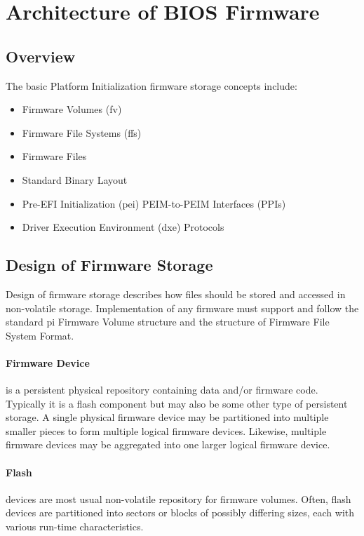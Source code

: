 \section{Architecture of BIOS Firmware}
\subsection{Overview}
The basic Platform Initialization firmware storage concepts include:
\begin{itemize}
	\item Firmware Volumes (\gls{fv})
	\item Firmware File Systems (\gls{ffs})
	\item Firmware Files
	\item Standard Binary Layout
	\item Pre-EFI Initialization (\gls{pei}) PEIM-to-PEIM Interfaces (PPIs)
	\item Driver Execution Environment (\gls{dxe}) Protocols
\end{itemize}

\subsection{Design of Firmware Storage}
Design of firmware storage describes how files should be stored and accessed in non-volatile storage. Implementation of any firmware must support and follow the standard \gls{pi} Firmware Volume structure and the structure of Firmware File System Format.

\paragraph{Firmware Device} is a persistent physical repository containing data and/or firmware code. Typically it is a flash component but may also be some other type of persistent storage. A single physical firmware device may be partitioned into multiple smaller pieces to form multiple logical firmware devices. Likewise, multiple firmware devices may be aggregated into one larger logical firmware device.

\paragraph{Flash} devices are most usual non-volatile repository for firmware volumes. Often, flash devices are partitioned into sectors or blocks of possibly differing sizes, each with various run-time characteristics.

